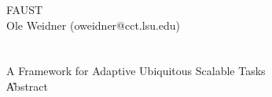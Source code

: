 
\newcommand{\ppdocument}{FAUST} 
\newcommand{\ppversion} {0.1}
\newcommand{\ppbasename}{faust} 
\newcommand{\ppemail}   {oweidner@cct.lsu.edu}



\ppverb{\|}



  \thispagestyle{empty} \ppdocument{}
  \hfill \\
  \hfill {\ppdate}\hfill Ole Weidner (oweidner@cct.lsu.edu)\\[-2em]
  
  \hrulefill\\[2.0em]

  \\[1.0em]
  {\large A Framework for Adaptive Ubiquitous Scalable Tasks}\\[2.0em]

  \U{Abstract}
  

        




  \newpage \setcounter{tocdepth}{4} \tableofcontents

  \newpage







